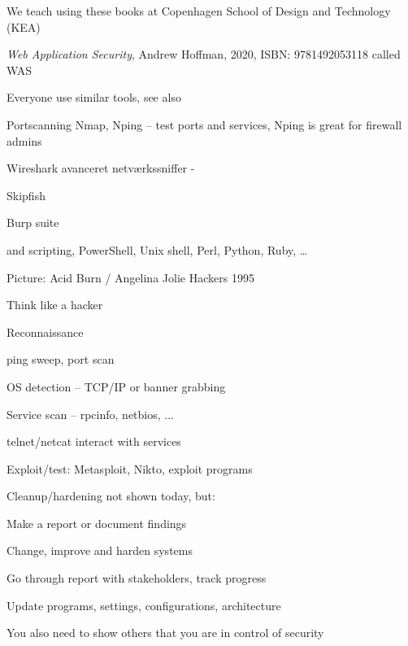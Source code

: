 \documentclass[Screen16to9,17pt]{foils}
\begin{document}
We teach using these books at Copenhagen School of Design and Technology (KEA)


\emph{Web Application Security}, Andrew Hoffman, 2020, ISBN: 9781492053118 called WAS





\begin{list2}
\item Everyone use similar tools, see also 
\item Portscanning Nmap, Nping -- test ports and services, Nping is great for firewall admins 
\item Wireshark avanceret netværkssniffer - 
\item Skipfish 
\item Burp suite 


\item and scripting, PowerShell, Unix shell, Perl, Python, Ruby, \ldots
\end{list2}

Picture: Acid Burn / Angelina Jolie Hackers 1995



\begin{list1}
\item Think like a hacker
\item Reconnaissance
\begin{list2}
\item ping sweep, port scan
\item OS detection -- TCP/IP or banner grabbing
\item Service scan -- rpcinfo, netbios, ...
\item telnet/netcat interact with services
\end{list2}
\item Exploit/test: Metasploit, Nikto, exploit programs
\item Cleanup/hardening not shown today, but:
\begin{list2}
\item Make a report or document findings
\item Change, improve and harden systems
\item Go through report with stakeholders, track progress
\item Update programs, settings, configurations, architecture
\end{list2}
\item You also need to show others that you are in control of security
\end{list1}
\end{document}
